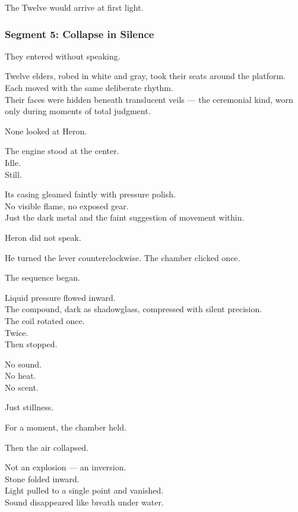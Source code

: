 \documentclass[9pt]{article}
\begin{document}
The Twelve would arrive at first light.

\newpage

\subsubsection*{Segment 5: Collapse in Silence}

They entered without speaking.

Twelve elders, robed in white and gray, took their seats around the platform.\\
Each moved with the same deliberate rhythm.\\
Their faces were hidden beneath translucent veils — the ceremonial kind, worn only during moments of total judgment.

None looked at Heron.

The engine stood at the center.\\
Idle.\\
Still.

Its casing gleamed faintly with pressure polish.\\
No visible flame, no exposed gear.\\
Just the dark metal and the faint suggestion of movement within.

Heron did not speak.

He turned the lever counterclockwise.  
The chamber clicked once.

\vspace{1em}

The sequence began.

Liquid pressure flowed inward.\\
The compound, dark as shadowglass, compressed with silent precision.\\
The coil rotated once.\\
Twice.\\
Then stopped.

No sound.\\
No heat.\\
No scent.

Just stillness.

\vspace{1em}

For a moment, the chamber held.

Then the air collapsed.

\vspace{1em}

Not an explosion — an inversion.\\
Stone folded inward.\\
Light pulled to a single point and vanished.\\
Sound disappeared like breath under water.
\end{document}
